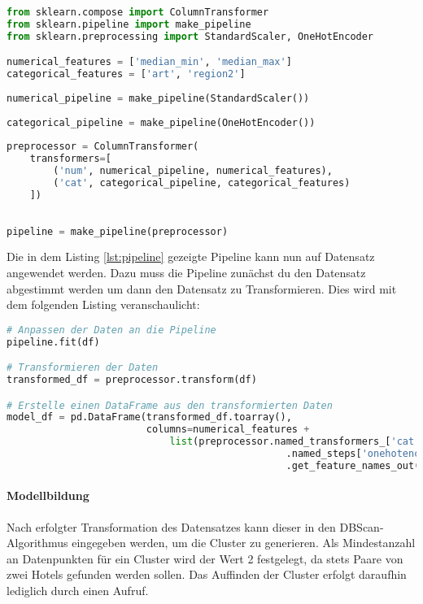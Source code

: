 \begin{lstlisting}[language=Python, label=lst:pipeline, caption=Datensatz Pipeline]
from sklearn.compose import ColumnTransformer
from sklearn.pipeline import make_pipeline
from sklearn.preprocessing import StandardScaler, OneHotEncoder

numerical_features = ['median_min', 'median_max']
categorical_features = ['art', 'region2']
    
numerical_pipeline = make_pipeline(StandardScaler())
    
categorical_pipeline = make_pipeline(OneHotEncoder())
    
preprocessor = ColumnTransformer(
    transformers=[
        ('num', numerical_pipeline, numerical_features),
        ('cat', categorical_pipeline, categorical_features)
    ])
    
    
pipeline = make_pipeline(preprocessor)
\end{lstlisting}

Die in dem Listing \ref{lst:pipeline} gezeigte Pipeline kann nun auf Datensatz angewendet werden. Dazu muss die Pipeline zunächst du den Datensatz abgestimmt werden um dann den Datensatz zu Transformieren. Dies wird mit dem folgenden Listing veranschaulicht:

\begin{lstlisting}[language=Python, label=lst:pipeline2, caption=Ausführung der Pipeline auf dem Datensatz]
# Anpassen der Daten an die Pipeline
pipeline.fit(df)

# Transformieren der Daten
transformed_df = preprocessor.transform(df)

# Erstelle einen DataFrame aus den transformierten Daten
model_df = pd.DataFrame(transformed_df.toarray(), 
                        columns=numerical_features + 
                            list(preprocessor.named_transformers_['cat']
                                                .named_steps['onehotencoder']
                                                .get_feature_names_out(categorical_features)))
\end{lstlisting}

\paragraph{Modellbildung} 
Nach erfolgter Transformation des Datensatzes kann dieser in den DBScan-Algorithmus eingegeben werden, um die Cluster zu generieren. Als Mindestanzahl an Datenpunkten für ein Cluster wird der Wert 2 festgelegt, da stets Paare von zwei Hotels gefunden werden sollen. Das Auffinden der Cluster erfolgt daraufhin lediglich durch einen Aufruf.

